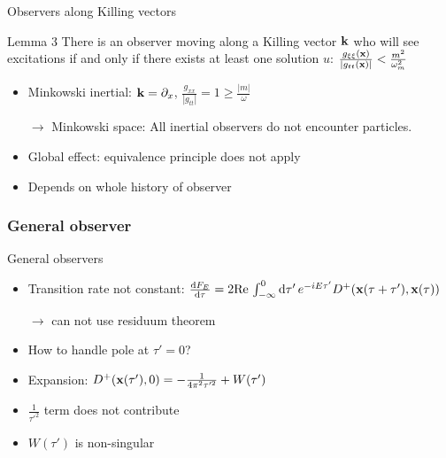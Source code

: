 \documentclass{beamer}
\begin{document}
\begin{frame}{Observers along Killing vectors}
\begin{block}{Lemma 3}
There is an observer moving along a Killing vector \(\vb{k}\) who will see excitations if and only if there exists at least one solution \(u\): \(\frac{g_{\xi\xi}(\vb{x})}{|g_{tt}(\vb{x})|} < \frac{m^2}{\omega_m^2}\)
\end{block} 
\begin{itemize}
	\item Minkowski inertial: \(\vb{k} = \partial_x\), \(\frac{g_{xx}}{|g_{tt}|} = 1 \geq \frac{|m|}{\omega}\) 
	\item[\(\to\)] Minkowski space: All inertial observers do not encounter particles.
	\item[]
	\item Global effect: equivalence principle does not apply
	\item Depends on whole history of observer 
\end{itemize}
\end{frame}


\subsubsection{General observer}
\begin{frame}{General observers}
\begin{itemize}
	\item Transition rate not constant: \(\dv{F_E}{\tau} = 2 \mathrm{Re}\,\int_{-\infty}^0 \dd{\tau'} e^{-i E \tau'} D^+(\vb{x}(\tau + \tau'), \vb{x}(\tau))\)
	\item[]\(\to\) can not use residuum theorem
	\item How to handle pole at \(\tau' = 0\)?
	\item[]
	\item Expansion: \(D^+(\vb{x}(\tau'), 0) = - \frac{1}{4\pi^2\tau'^2} + W(\tau')\)
	\item \(\frac{1}{\tau'^2}\) term does not contribute
	\item \(W(\tau')\) is non-singular
\end{itemize}
\end{frame}

\frame{\setcounter{tocdepth}{1}\hspace{1cm}\tableofcontents}
\end{document}

